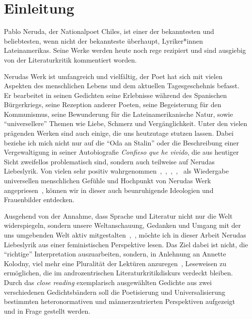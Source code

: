 \section{Einleitung}

Pablo Neruda, der Nationalpoet Chiles, ist einer der bekanntesten und beliebtesten, wenn nicht der bekannteste überhaupt, Lyriker*innen Lateinamerikas.
Seine Werke werden heute noch rege rezipiert und sind ausgiebig von der Literaturkritik kommentiert worden.


Nerudas Werk ist umfangreich und vielfältig, der Poet hat sich mit vielen Aspekten des menschlichen Lebens und dem aktuellen Tagesgeschehnis befasst.
Er bearbeitet in seinen Gedichten seine Erlebnisse während des Spanischen Bürgerkriegs, seine Rezeption anderer Poeten, seine Begeisterung für den Kommunismus, seine Bewunderung für die Lateinamerikanische Natur, sowie ``universellere'' Themen wie Liebe, Schmerz und Vergänglichkeit.
Unter den vielen prägenden Werken sind auch einige, die uns heutzutage stutzen lassen.
Dabei beziehe ich mich nicht nur auf die ``Oda an Stalin'' oder die Beschreibung einer Vergewaltigung in seiner Autobiografie \textit{Confieso que he vivido}, die aus heutiger Sicht zweifellos problematisch sind, sondern auch teilweise auf Nerudas Liebeslyrik.
Von vielen sehr positiv wahrgenommen~\cite{Eandi},~\cite{Ellis1985},~\cite{Araya1982},~\cite{Montes1985},~\cite{Lagos1975} als Wiedergabe universellen menschlichen Gefühle und Hochpunkt von Nerudas Werk angepriesen~\cite{Eandi},
können wir in dieser auch beunruhigende Ideologien und Frauenbilder entdecken.


Ausgehend von der Annahme, dass Sprache und Literatur nicht nur die Welt widerspiegeln, sondern unsere Weltanschauung, Gedanken und Umgang mit der uns umgebenden Welt aktiv mitgestalten~\cite{Kolodny1980},~\cite{North2013},
möchte ich in dieser Arbeit Nerudas Liebeslyrik aus einer feministischen Perspektive lesen.
Das Ziel dabei ist nicht, die ``richtige'' Interpretation auszuarbeiten, sondern, in Anlehnung an Annette Kolodny, viel mehr eine Pluralität der Lektüren anzuregen~\cite{Kolodny1980}, Leseweisen zu ermöglichen, die im androzentrischen Literaturkritikdiskurs verdeckt bleiben.
Durch das \textit{close reading} exemplarisch ausgewählten Gedichte aus zwei verschiedenen Gedichtsbändern soll die Poetisierung und Universalisierung bestimmten heteronormativen und männerzentrierten Perspektiven aufgezeigt und in Frage gestellt werden.

